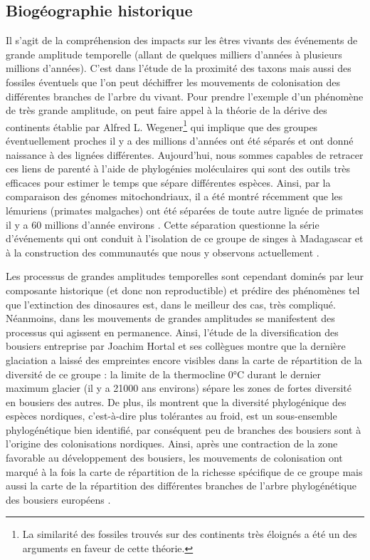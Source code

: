\subsection*{Biogéographie
historique}\label{bioguxe9ographie-historique}

Il s'agit de la compréhension des impacts sur les êtres vivants des
événements de grande amplitude temporelle (allant de quelques milliers
d'années à plusieurs millions d'années). C'est dans l'étude de la
proximité des taxons mais aussi des fossiles éventuels que l'on peut
déchiffrer les mouvements de colonisation des différentes branches de
l'arbre du vivant. Pour prendre l'exemple d'un phénomène de très grande
amplitude, on peut faire appel à la théorie de la dérive des continents
établie par Alfred L. Wegener\footnote{La similarité des fossiles
  trouvés sur des continents très éloignés a été un des arguments en
  faveur de cette théorie.} qui implique que des groupes éventuellement
proches il y a des millions d'années ont été séparés et ont donné
naissance à des lignées différentes. Aujourd'hui, nous sommes capables
de retracer ces liens de parenté à l'aide de phylogénies moléculaires
qui sont des outils très efficaces pour estimer le temps que sépare
différentes espèces. Ainsi, par la comparaison des génomes
mitochondriaux, il a été montré récemment que les lémuriens (primates
malgaches) ont été séparées de toute autre lignée de primates il y a 60
millions d'année environs \citep{Finstermeier2013}. Cette séparation
questionne la série d'événements qui ont conduit à l'isolation de ce
groupe de singes à Madagascar et à la construction des communautés que
nous y observons actuellement \citep{Razafindratsima2013}.

Les processus de grandes amplitudes temporelles sont cependant dominés
par leur composante historique (et donc non reproductible) et prédire
des phénomènes tel que l'extinction des dinosaures est, dans le meilleur
des cas, très compliqué. Néanmoins, dans les mouvements de grandes
amplitudes se manifestent des processus qui agissent en permanence.
Ainsi, l'étude de la diversification des bousiers entreprise par Joachim
Hortal et ses collègues \citep{Hortal2011} montre que la dernière
glaciation a laissé des empreintes encore visibles dans la carte de
répartition de la diversité de ce groupe : la limite de la thermocline
0°C durant le dernier maximum glacier (il y a 21000 ans environs) sépare
les zones de fortes diversité en bousiers des autres. De plus, ils
montrent que la diversité phylogénique des espèces nordiques,
c'est-à-dire plus tolérantes au froid, est un sous-ensemble
phylogénétique bien identifié, par conséquent peu de branches des
bousiers sont à l'origine des colonisations nordiques. Ainsi, après une
contraction de la zone favorable au développement des bousiers, les
mouvements de colonisation ont marqué à la fois la carte de répartition
de la richesse spécifique de ce groupe mais aussi la carte de la
répartition des différentes branches de l'arbre phylogénétique des
bousiers européens \citep{Hortal2011}.

